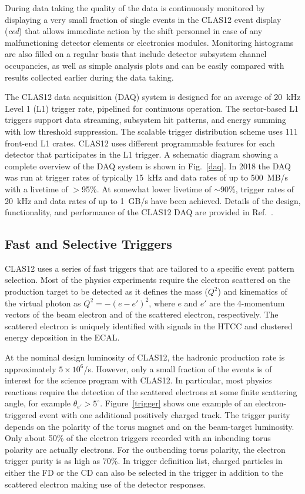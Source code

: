 \documentclass[final,3p,twocolumn]{elsarticle}
\begin{document}
During data taking the quality of the data is continuously monitored by displaying a very small fraction of single
events in the CLAS12 event display ({\it ced}) that allows immediate action by the shift personnel in case of any
malfunctioning detector elements or electronics modules. Monitoring histograms are also filled on a regular basis
that include detector subsystem channel occupancies, as well as simple analysis plots and can be easily compared with
results collected earlier during the data taking.  

The CLAS12 data acquisition (DAQ) system is designed for an average of 20~kHz Level 1 (L1) trigger rate, pipelined
for continuous operation. The sector-based  L1 triggers support data streaming, subsystem hit patterns, and energy
summing with low threshold suppression.  The scalable trigger distribution scheme uses 111 front-end L1 crates.
CLAS12 uses different programmable features for each detector that participates in the L1 trigger. A schematic
diagram showing a complete overview of the DAQ system is shown in Fig.~\ref{daq}. In 2018 the DAQ was run at
trigger rates of typically 15~kHz and data rates of up to 500~MB/s with a livetime of $>$95\%. At somewhat lower
livetime of $\sim$90\%, trigger rates of 20~kHz and data rates of up to 1~GB/s have been achieved. Details of the
design, functionality, and performance of the CLAS12 DAQ are provided in Ref.~\cite{DAQ}. 
 
\subsection{Fast and Selective Triggers} 

CLAS12 uses a series of fast triggers that are tailored to a specific event pattern selection. Most of the physics
experiments require the electron scattered on the production target to be detected as it defines the mass ($Q^2$)
and kinematics of the virtual photon as $Q^2 = -(e - e')^2$, where $e$ and $e'$ are the 4-momentum vectors of the
beam electron and of the scattered electron, respectively. The scattered electron is uniquely identified with signals in
the HTCC and clustered energy deposition in the ECAL. 

At the nominal design luminosity of CLAS12, the hadronic production rate is approximately $5 \times 10^6$/s.
However, only a small fraction of the events is of interest for the science program with CLAS12. In particular, most
physics reactions require the detection of the scattered electrons at some finite scattering angle, for example
$\theta_{e'} > 5^\circ$.  Figure~\ref{trigger} shows one example of an electron-triggered event with one additional
positively charged track. The trigger purity depends on the polarity of the torus magnet and on the beam-target
luminosity. Only about 50\% of the electron triggers recorded with an inbending torus polarity are actually electrons.
For the outbending torus polarity, the electron trigger purity is as high as 70\%. In trigger definition list, charged
particles in either the FD or the CD can also be selected in the trigger in addition to the scattered electron making
use of the detector responses.    
   
\end{document}
